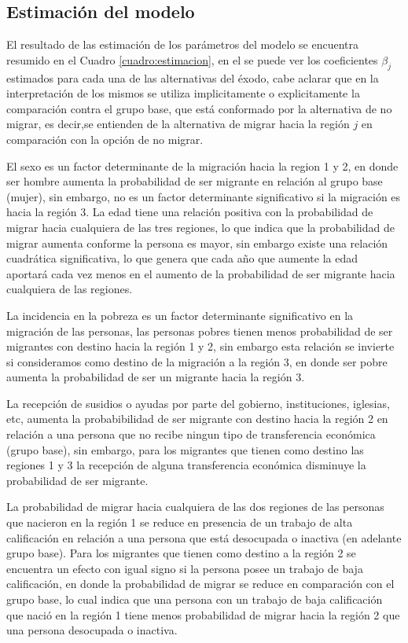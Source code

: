 \documentclass[12pt,a4paper]{article}
\begin{document}
\subsection{Estimación del modelo}
El resultado de las estimación de los parámetros del modelo se encuentra resumido en el Cuadro \ref{cuadro:estimacion}, en el se puede ver los coeficientes $\beta_{j}$ estimados para cada una de las alternativas del éxodo, cabe aclarar que en la interpretación de los mismos se utiliza implicitamente o explicitamente la comparación contra el grupo base, que está conformado por la alternativa de no migrar, es decir,se entienden de la alternativa de migrar hacia la región $j$ en comparación con la opción de no migrar.

El sexo es un factor determinante de la migración hacia la region 1 y 2, en donde ser hombre aumenta la probabilidad de ser migrante en relación al grupo base (mujer), sin embargo, no es un factor determinante significativo si la migración es hacia la región 3. La edad tiene una relación positiva con la probabilidad de migrar hacia cualquiera de las tres regiones, lo que indica que la probabilidad de migrar aumenta conforme la persona es mayor, sin embargo existe una relación cuadrática significativa, lo que genera que cada año que aumente la edad aportará cada vez menos en el aumento de  la probabilidad de ser migrante hacia cualquiera de las regiones.

La incidencia en la pobreza es un factor determinante significativo en la migración de las personas, las personas pobres tienen menos probabilidad de ser migrantes con destino hacia la región 1 y 2, sin embargo esta relación se invierte si consideramos como destino de la migración a la región 3, en donde ser pobre aumenta la probabilidad de ser un migrante hacia la región 3.

La recepción de susidios o ayudas por parte del gobierno, instituciones, iglesias, etc, aumenta la probabibilidad de ser migrante con destino hacia la región 2 en relación a una persona que no recibe ningun tipo de transferencia económica (grupo base), sin embargo, para los migrantes que tienen como destino las regiones 1 y 3 la recepción de alguna transferencia económica  disminuye la probabilidad de ser migrante.

La probabilidad de migrar hacia cualquiera de las dos regiones de las personas que nacieron en la región 1 se reduce en presencia de un trabajo de alta calificación en relación a una persona que está desocupada o inactiva (en adelante grupo base). Para los migrantes que tienen como destino a la región 2 se encuentra  un efecto con igual signo si la persona posee un trabajo de baja calificación, en donde la probabilidad de migrar se reduce en comparación con el grupo base, lo cual indica que una persona  con un trabajo de baja calificación que nació en la región 1 tiene menos probabilidad de migrar hacia la región 2 que una persona desocupada o inactiva.
\end{document}
